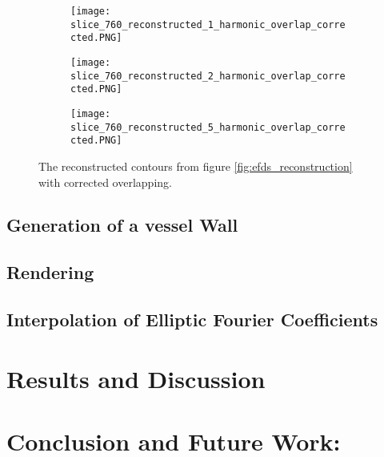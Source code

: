 \documentclass[thesis.tex]{subfiles}
\begin{document}
\begin{figure}
	\begin{subfigure}[t]{0.45\textwidth}
		\texttt{[image: slice\_760\_reconstructed\_1\_harmonic\_overlap\_corrected.PNG]}
	\caption{}		
	\end{subfigure}
\hspace{0.05\textwidth}
	\begin{subfigure}[t]{0.45\textwidth}
		\texttt{[image: slice\_760\_reconstructed\_2\_harmonic\_overlap\_corrected.PNG]}		
\caption{}	
	\end{subfigure}
\centering
\begin{subfigure}[t]{0.45\textwidth}
		\texttt{[image: slice\_760\_reconstructed\_5\_harmonic\_overlap\_corrected.PNG]}		
\caption{}	
	\end{subfigure}
	\caption{The reconstructed contours from figure \ref{fig:efds_reconstruction} with corrected overlapping.}
\label{fig:obliqueslices}
\end{figure}   

\section{Generation of a vessel Wall}

\section{Rendering}

\section{Interpolation of Elliptic Fourier Coefficients}

\chapter{Results and Discussion}\label{chap:basics}



\chapter{Conclusion and Future Work:}\label{chap:basics}

\subfilebib %
\end{document}

